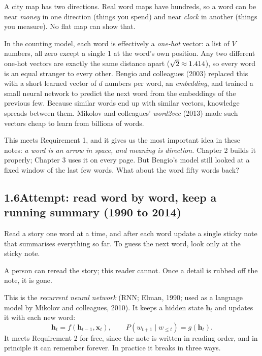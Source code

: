 \begin{breaks}
A city map has two directions. Real word maps have hundreds, so a word can be near \emph{money} in one
direction (things you spend) and near \emph{clock} in another (things you measure). No flat map can show that.
\end{breaks}

\Exactly In the counting model, each word is effectively a \emph{one-hot} vector: a list of $V$ numbers, all zero
except a single 1 at the word's own position. Any two different one-hot vectors are exactly the same distance
apart ($\sqrt2 \approx 1.414$), so every word is an equal stranger to every other. Bengio and colleagues
(2003) replaced this with a short learned vector of $d$ numbers per word, an \emph{embedding}, and trained a
small neural network to predict the next word from the embeddings of the previous few. Because similar words
end up with similar vectors, knowledge spreads between them. Mikolov and colleagues' \emph{word2vec} (2013) made
such vectors cheap to learn from billions of words.

\Why This meets Requirement 1, and it gives us the most important idea in these notes: \emph{a word is an arrow
in space, and meaning is direction.} Chapter 2 builds it properly; Chapter 3 uses it on every page. But
Bengio's model still looked at a fixed window of the last few words. What about the word fifty words back?


\subsection*{1.6\quad Attempt: read word by word, keep a running summary (1990 to 2014)}

\Picture Read a story one word at a time, and after each word update a single sticky note that summarises
everything so far. To guess the next word, look only at the sticky note.

\begin{breaks}
A person can reread the story; this reader cannot. Once a detail is rubbed off the note, it is gone.
\end{breaks}

\Exactly This is the \emph{recurrent neural network} (RNN; Elman, 1990; used as a language model by Mikolov and
colleagues, 2010). It keeps a hidden state $\bm{h}_t$ and updates it with each new word:
\[
\bm{h}_t = f(\bm{h}_{t-1}, \bm{x}_t), \qquad P(w_{t+1}\mid w_{\le t}) = g(\bm{h}_t).
\]
It meets Requirement 2 for free, since the note is written in reading order, and in principle it can remember
forever. In practice it breaks in three ways.

